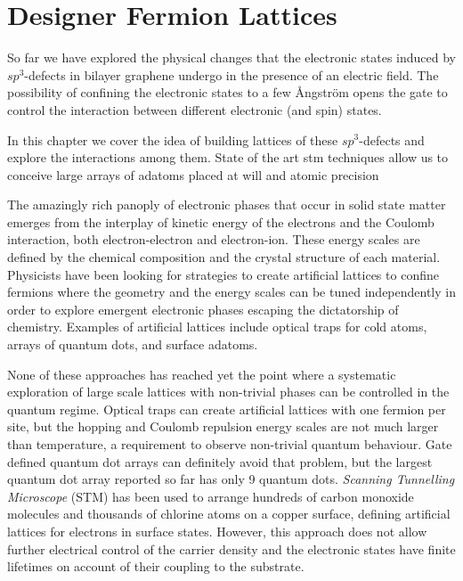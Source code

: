 \chapter{Designer Fermion Lattices}
\label{ch:designer}
So far we have explored the physical changes that the electronic states induced by $sp^3$-defects in bilayer graphene undergo in the presence of an electric field. The possibility of confining the electronic states to a few Ångström opens the gate to control the interaction between different electronic (and spin) states.

In this chapter we cover the idea of building lattices of these $sp^3$-defects and explore the interactions among them. State of the art \ac{stm} techniques allow us to conceive large arrays of adatoms placed at will and atomic precision

The amazingly rich panoply of electronic phases that occur in solid state matter emerges from the interplay of kinetic energy of the electrons and the Coulomb interaction, both electron-electron and electron-ion. These energy scales are defined by the chemical composition and the crystal structure of each material. Physicists have been looking for strategies to create artificial lattices to confine fermions where the geometry and the energy scales can be tuned independently in order to explore emergent electronic phases escaping the dictatorship of chemistry.
Examples of artificial lattices include optical traps for cold atoms\cite{Cocchi2016}, arrays of quantum dots\cite{mortemousque2018,dehollain2019}, and surface adatoms\cite{gomes2012,drost2017,girovsky2017,khajetoorians2019}. 


None of these approaches has reached yet the point where a systematic exploration of large scale lattices with non-trivial phases can be controlled in the quantum regime.
Optical traps can create artificial lattices with one fermion per site, but the hopping and Coulomb repulsion energy scales are not much larger than temperature,\cite{Cocchi2016} a requirement to observe non-trivial quantum behaviour.
Gate defined quantum dot arrays can definitely avoid that problem\cite{dehollain2019}, but the largest quantum dot array reported so far has only 9 quantum dots\cite{mortemousque2018}.
\emph{Scanning Tunnelling Microscope} (STM) has been used to arrange hundreds of carbon monoxide molecules\cite{gomes2012} and thousands of chlorine atoms\cite{Kalff2016} on a copper surface, defining artificial lattices for electrons in surface states. However, this approach does not allow further electrical control of the carrier density and the electronic states have finite lifetimes on account of their coupling to the substrate. 

